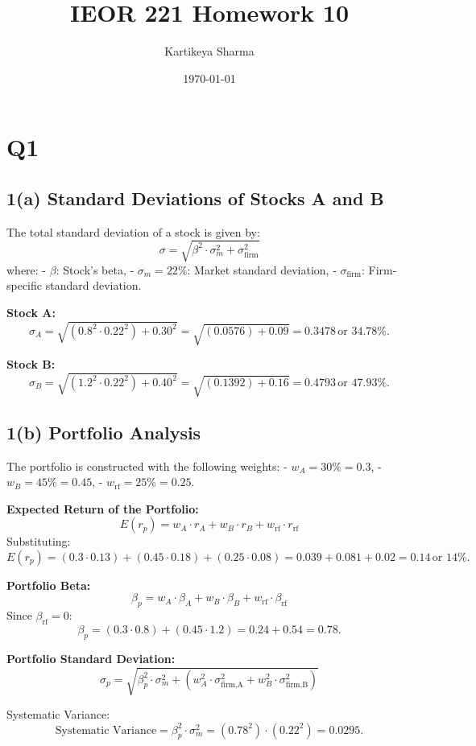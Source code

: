 \documentclass{article}
\title{IEOR 221 Homework 10}
\author{Kartikeya Sharma}
\date{\today}
\begin{document}
\maketitle

\section*{\textbf{Q1}}

\subsection*{\textbf{1(a) Standard Deviations of Stocks A and B}}

The total standard deviation of a stock is given by:
\[
\sigma = \sqrt{\beta^2 \cdot \sigma_m^2 + \sigma_{\text{firm}}^2}
\]
where:
- \( \beta \): Stock's beta,
- \( \sigma_m = 22\% \): Market standard deviation,
- \( \sigma_{\text{firm}} \): Firm-specific standard deviation.

\textbf{Stock A:}
\[
\sigma_A = \sqrt{(0.8^2 \cdot 0.22^2) + 0.30^2} = \sqrt{(0.0576) + 0.09} = 0.3478 \, \text{or } 34.78\%.
\]

\textbf{Stock B:}
\[
\sigma_B = \sqrt{(1.2^2 \cdot 0.22^2) + 0.40^2} = \sqrt{(0.1392) + 0.16} = 0.4793 \, \text{or } 47.93\%.
\]

\subsection*{\textbf{1(b) Portfolio Analysis}}

The portfolio is constructed with the following weights:
- \( w_A = 30\% = 0.3 \),
- \( w_B = 45\% = 0.45 \),
- \( w_{\text{rf}} = 25\% = 0.25 \).

\textbf{Expected Return of the Portfolio:}
\[
E(r_p) = w_A \cdot r_A + w_B \cdot r_B + w_{\text{rf}} \cdot r_{\text{rf}}
\]
Substituting:
\[
E(r_p) = (0.3 \cdot 0.13) + (0.45 \cdot 0.18) + (0.25 \cdot 0.08) = 0.039 + 0.081 + 0.02 = 0.14 \, \text{or } 14\%.
\]

\textbf{Portfolio Beta:}
\[
\beta_p = w_A \cdot \beta_A + w_B \cdot \beta_B + w_{\text{rf}} \cdot \beta_{\text{rf}}
\]
Since \( \beta_{\text{rf}} = 0 \):
\[
\beta_p = (0.3 \cdot 0.8) + (0.45 \cdot 1.2) = 0.24 + 0.54 = 0.78.
\]

\textbf{Portfolio Standard Deviation:}
\[
\sigma_p = \sqrt{\beta_p^2 \cdot \sigma_m^2 + \left(w_A^2 \cdot \sigma_{\text{firm,A}}^2 + w_B^2 \cdot \sigma_{\text{firm,B}}^2\right)}
\]

Systematic Variance:
\[
\text{Systematic Variance} = \beta_p^2 \cdot \sigma_m^2 = (0.78^2) \cdot (0.22^2) = 0.0295.
\]
\end{document}
